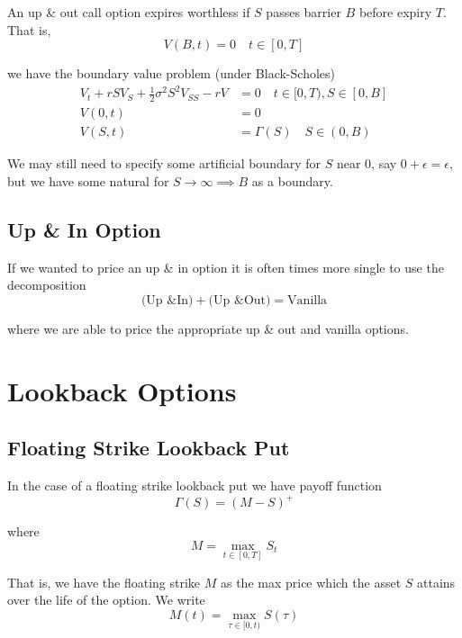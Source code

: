 \documentclass[12pt]{article}
\newlength\tindent
\renewcommand{\indent}{\hspace*{\tindent}}
\begin{document}
An up \& out call option expires worthless if $S$ passes barrier $B$ before expiry $T$. That is,
\begin{equation*}
	V(B, t) = 0 \quad t \in [0,T]
\end{equation*}

we have the boundary value problem (under Black-Scholes)
\begin{align*}
	V_t + rSV_S + \frac{1}{2}\sigma^2S^2V_{SS} - rV &= 0 \quad t \in [0,T), S \in [0, B] \\
	V(0, t) &= 0 \\
	V(S, t) &= \Gamma(S) \quad S \in (0, B)
\end{align*}

We may still need to specify some artificial boundary for $S$ near $0$, say $0 + \epsilon = \epsilon$, but we have some natural for $S \to \infty \implies B$ as a boundary. 

\subsection{Up \& In Option} 

If we wanted to price an up \& in option it is often times more single to use the decomposition 
\begin{equation*}
	\text{(Up \& In)} + \text{(Up \& Out)} = \text{Vanilla}
\end{equation*}

where we are able to price the appropriate up \& out and vanilla options.

\section{Lookback Options}

\subsection{Floating Strike Lookback Put}

In the case of a floating strike lookback put we have payoff function
\begin{equation*}
	\Gamma(S) = \left(M - S\right)^+
\end{equation*}

where
\begin{equation*}
	M = \max_{t \in [0,T]} S_t
\end{equation*}

\indent That is, we have the floating strike $M$ as the max price which the asset $S$ attains over the life of the option. We write
\begin{equation*}
	M(t) = \max_{\tau \in [0, t)} S(\tau)
\end{equation*}
\end{document}
